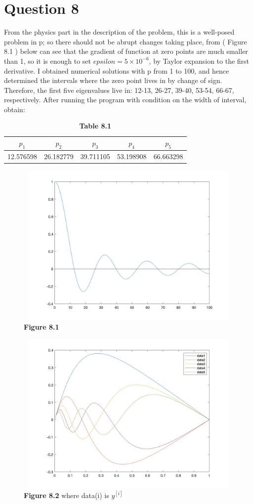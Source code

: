 \documentclass[11pt]{article}
\begin{document}
\section*{Question 8}
From the physics part in the description of the problem, this is a well-posed problem in p; so there should not be abrupt changes taking place, from ( Figure 8.1 ) below can see that the gradient of function at zero points are much smaller than 1, so it is enough to set $epsilon = 5 \times 10^{-6}$, by Taylor expansion to the first derivative. I obtained numerical solutions with p from 1 to 100, and hence determined the intervals where the zero point lives in by change of sign. Therefore, the first five eigenvalues live in: 12-13, 26-27, 39-40, 53-54, 66-67,  respectively.
After running the program with condition on the width of interval, obtain:
\begin{table}[H]
\centering
\begin{tabular}{|c|c|c|c|c|}  
\hline
$p_{1}$ & $p_{2}$ & $p_{3}$ & $p_{4}$ & $p_{5}$\\
\hline
12.576598 & 26.182779 & 39.711105 & 53.198908 & 66.663298\\
\hline
\end{tabular}
\caption{\textbf{Table 8.1}}
\label{Table}
\end{table}
\begin{figure}[H]
\centering
\includegraphics[width = 13cm, height = 8cm]{roots.jpg}
\caption{\textbf{Figure 8.1} }
\end{figure}
\begin{figure}[H]
\centering
\includegraphics[width = 13cm, height = 8cm]{Q8.jpg}
\caption{\textbf{Figure 8.2} where data(i) is $y^{[i]}$}
\end{figure}
\end{document}
